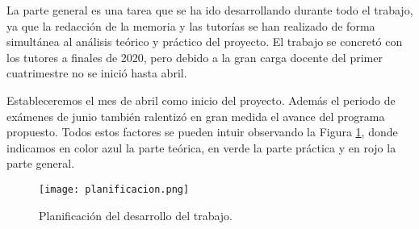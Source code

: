 La parte general es una tarea que se ha ido desarrollando durante todo el trabajo, ya que la redacción de la memoria y las tutorías se han realizado de forma simultánea al análisis teórico y práctico del proyecto. El trabajo se concretó con los tutores a finales de 2020, pero debido a la gran carga docente del primer cuatrimestre no se inició hasta abril. 

Estableceremos el mes de abril como inicio del proyecto. Además el periodo de exámenes de junio también ralentizó en gran medida el avance del programa propuesto. Todos estos factores se pueden intuir observando la Figura \ref{fig:planning}, donde indicamos en color azul la parte teórica, en verde la parte práctica y en rojo la parte general.\\

\begin{figure}[h]
	\centering
	\texttt{[image: planificacion.png]}
	\caption{Planificación del desarrollo del trabajo.}
    \label{fig:planning}
\end{figure}

